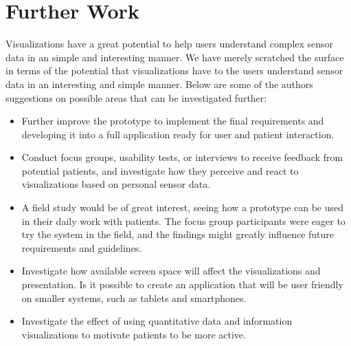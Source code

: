 \section{Further Work}
Visualizations have a great potential to help users understand complex sensor data in an simple and interesting manner.
We have merely scratched the surface in terms of the potential that visualizations have to  the users understand sensor data in an interesting and simple manner. Below are some of the authors suggestions on possible areas that can be investigated further:

\begin{itemize}
  \item Further improve the  prototype to implement the final requirements and developing it into a full application ready for user and patient interaction.
  \item Conduct focus groups, usability tests, or interviews to receive feedback from potential patients, and investigate how they perceive and react to visualizations based on personal sensor data.
  \item A field study would be of great interest, seeing how a prototype can be used in their daily work with patients. The focus group participants were eager to try the system in the field, and the findings might greatly influence future requirements and guidelines.
  \item Investigate how available screen space will affect the visualizations and presentation. Is it possible to create an application that will be user friendly on smaller systems, such as tablets and smartphones.
  \item Investigate the effect of using quantitative data and information visualizations to motivate patients to be more active.
\end{itemize}

